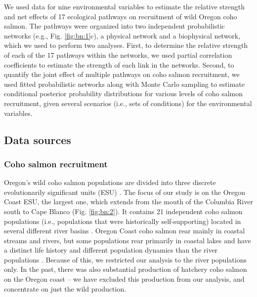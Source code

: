 We used data for nine environmental variables to estimate the relative strength
and net effects of 17 ecological pathways on recruitment of wild Oregon coho
salmon. The pathways were organized into two independent probabilistic networks
(e.g., Fig. \ref{fig:bn:1}c), a physical network and a biophysical network,
which we used to perform two analyses. First, to determine the relative strength
of each of the 17 pathways within the networks, we used partial correlation
coefficients to estimate the strength of each link in the networks. Second, to
quantify the joint effect of multiple pathways on coho salmon recruitment, we
used fitted probabilistic networks along with Monte Carlo sampling to estimate
conditional posterior probability distributions for various levels of coho
salmon recruitment, given several scenarios (i.e., sets of conditions) for the
environmental variables.


\subsection{Data sources}

\subsubsection{Coho salmon recruitment}

Oregon's wild coho salmon populations are divided into three discrete
evolutionarily significant units (ESU) \citep{Weitkamp1995a, Lawson2007a}. The
focus of our study is on the Oregon Coast ESU, the largest one, which extends
from the mouth of the Columbia River south to Cape Blanco (Fig. \ref{fig:bn:2}).
It contains 21 independent coho salmon populations (i.e., populations that were
historically self-supporting) located in several different river basins
\citep{Lawson2007a}. Oregon Coast coho salmon rear mainly in coastal streams and
rivers, but some populations rear primarily in coastal lakes and have a distinct
life history and different population dynamics than the river populations
\citep{Lawson2004, PFMC2013}. Because of this, we restricted our analysis to the
river populations only. In the past, there was also substantial production of
hatchery coho salmon on the Oregon coast -- we have excluded this production
from our analysis, and concentrate on just the wild production.

